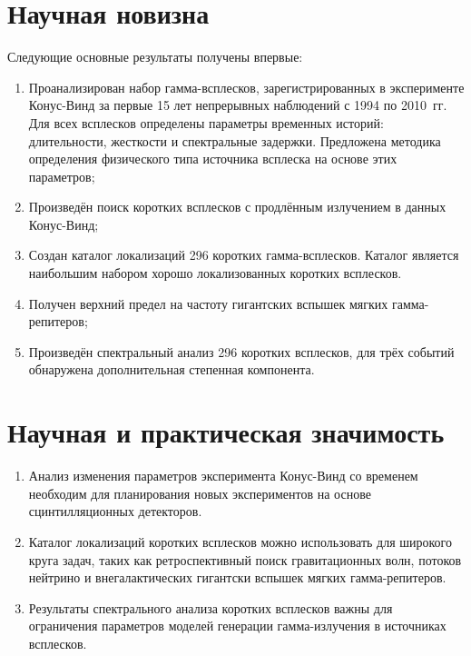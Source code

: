 \section{Научная новизна}
Следующие основные результаты получены впервые:
\begin{enumerate}
\item Проанализирован набор гамма-всплесков, зарегистрированных в эксперименте 
Конус-Винд за первые 15 лет непрерывных наблюдений с 1994 по 2010~гг. Для всех 
всплесков определены параметры временных историй: длительности, жесткости и спектральные задержки.
Предложена методика определения физического типа источника всплеска на основе этих параметров;

\item Произведён поиск коротких всплесков с продлённым излучением в данных Конус-Винд;

\item Создан каталог локализаций 296 коротких гамма-всплесков. Каталог является 
наибольшим набором хорошо локализованных коротких всплесков. 

\item Получен верхний предел на частоту гигантских вспышек мягких гамма-репитеров;

\item Произведён спектральный анализ 296 коротких всплесков, для трёх событий обнаружена
дополнительная степенная компонента.

\end{enumerate}


\section{Научная и практическая значимость}
\begin{enumerate}
\item Анализ изменения параметров эксперимента Конус-Винд со временем необходим для 
планирования новых экспериментов на основе сцинтилляционных детекторов.
\item Каталог локализаций коротких всплесков можно использовать 
для широкого круга задач, таких как ретроспективный поиск гравитационных волн, потоков нейтрино 
и внегалактических гигантски вспышек мягких гамма-репитеров.
\item Результаты спектрального анализа коротких всплесков важны для ограничения параметров
моделей генерации гамма-излучения в источниках всплесков.
\end{enumerate}

